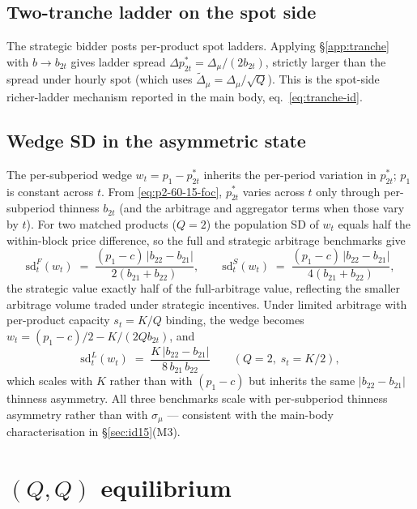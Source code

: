 \documentclass[11pt]{article}
\begin{document}
\subsection{Two-tranche ladder on the spot side}\label{app:60-15:ladder}
The strategic bidder posts per-product spot ladders. Applying \S\ref{app:tranche} with $b \to b_{2t}$ gives ladder spread $\Delta p^*_{2t} = \Delta_\mu/(2 b_{2t})$, strictly larger than the spread under hourly spot (which uses $\tilde\Delta_\mu = \Delta_\mu / \sqrt{Q}$). This is the spot-side richer-ladder mechanism reported in the main body, eq.~\eqref{eq:tranche-id}.

\subsection{Wedge SD in the asymmetric state}\label{app:60-15:wedgesd}
The per-subperiod wedge $w_t = p_1 - p_{2t}^*$ inherits the per-period variation in $p_{2t}^*$; $p_1$ is constant across $t$. From \eqref{eq:p2-60-15-foc}, $p_{2t}^*$ varies across $t$ only through per-subperiod thinness $b_{2t}$ (and the arbitrage and aggregator terms when those vary by $t$). For two matched products ($Q=2$) the population SD of $w_t$ equals half the within-block price difference, so the full and strategic arbitrage benchmarks give
\begin{equation}
\mathrm{sd}_t^{F}(w_t) \;=\; \frac{(p_1 - c)\,|b_{22} - b_{21}|}{2(b_{21} + b_{22})}, \qquad
\mathrm{sd}_t^{S}(w_t) \;=\; \frac{(p_1 - c)\,|b_{22} - b_{21}|}{4(b_{21} + b_{22})},
\label{eq:wedge-sd-asym-full-strat}
\end{equation}
the strategic value exactly half of the full-arbitrage value, reflecting the smaller arbitrage volume traded under strategic incentives. Under limited arbitrage with per-product capacity $s_t = K/Q$ binding, the wedge becomes $w_t = (p_1-c)/2 - K/(2Q b_{2t})$, and
\begin{equation}
\mathrm{sd}_t^{L}(w_t) \;=\; \frac{K\,|b_{22} - b_{21}|}{8\, b_{21}\, b_{22}} \qquad (Q=2,\; s_t = K/2),
\label{eq:wedge-sd-asym-limited}
\end{equation}
which scales with $K$ rather than with $(p_1-c)$ but inherits the same $|b_{22}-b_{21}|$ thinness asymmetry. All three benchmarks scale with per-subperiod thinness asymmetry rather than with $\sigma_\mu$ --- consistent with the main-body characterisation in \S\ref{sec:id15}(M3).

\section{$(Q,Q)$ equilibrium}\label{app:state-15-15}
\end{document}
